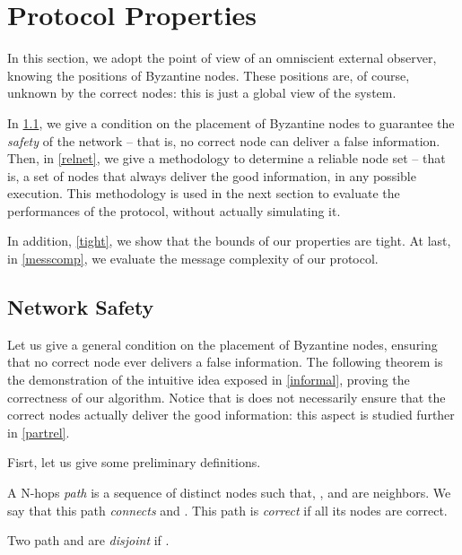 \documentclass[a4paper,11pt]{article}
\begin{document}
\section{Protocol Properties}
\label{sec_prop}

In this section, we adopt the point of view of an omniscient external observer, knowing the positions of Byzantine nodes. These positions are, of course, unknown by the correct nodes: this is just a global view of the system.

In \ref{safenet}, we give a condition on the placement of Byzantine nodes to guarantee the \emph{safety} of the network -- that is, no correct node can deliver a false information. Then, in \ref{relnet}, we give a methodology to determine a reliable node set -- that is, a set of nodes that always deliver the good information, in any possible execution. This methodology is used in the next section to evaluate the performances of the protocol, without actually simulating it.

In addition, \ref{tight}, we show that the bounds of our properties are tight.
At last, in \ref{messcomp}, we evaluate the message complexity of our protocol.

\subsection{Network Safety}
\label{safenet}


Let us give a general condition on the placement of Byzantine nodes, ensuring that no correct node ever delivers a false information.
The following theorem is the demonstration of the intuitive idea exposed in \ref{informal}, proving the correctness of our algorithm.
Notice that is does not necessarily ensure that the correct nodes actually deliver the good information: this aspect is studied further in \ref{partrel}.

Fisrt, let us give some preliminary definitions.

\begin{definition}[Path]
A N-hops \emph{path} is a sequence of distinct nodes  such that, ,  and  are neighbors.
We say that this path \emph{connects}  and . This path is \emph{correct} if all its nodes are correct.
\end{definition}

\begin{definition}
\label{disjoint}
Two path  and  are \emph{disjoint} if .
\end{definition}
\end{document}
